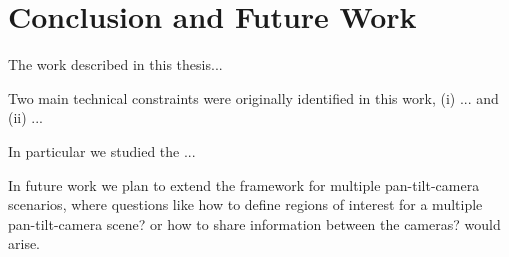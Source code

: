 \section{ Conclusion and Future Work}

The work described in this thesis...

Two main technical constraints were originally identified in this work, (i) ... and (ii) ...

In particular we studied the ...

In future work we plan to extend the framework for multiple pan-tilt-camera scenarios, where questions like how to define regions of interest for a multiple pan-tilt-camera scene? or how to share information between the cameras? would arise.
